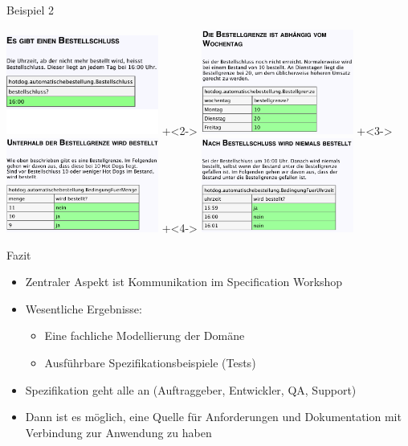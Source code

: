 \begin{frame}{Beispiel 2}

\begin{center}
\includegraphics[width=5cm]{bestellschluss.png}
\hfill{}
\onslide+<2->
\includegraphics[width=5cm]{wochentag.png}
 \newline
\onslide+<3->
\includegraphics[width=5cm]{bestellgrenze.png}
\hfill{}
\onslide+<4->
\includegraphics[width=5cm]{keineBestellungNachBestellschluss.png} 
\end{center}

\end{frame}

\begin{frame}{Fazit}

\begin{itemize}
	\item Zentraler Aspekt ist Kommunikation im Specification Workshop
	\item Wesentliche Ergebnisse:
	\begin{itemize}
		\item Eine fachliche Modellierung der Domäne
		\item Ausführbare Spezifikationsbeispiele (Tests)
	\end{itemize}
	\item Spezifikation geht alle an (Auftraggeber, Entwickler, QA, Support)
	\item Dann ist es möglich, eine Quelle für Anforderungen und Dokumentation mit Verbindung zur Anwendung zu haben
\end{itemize}

\end{frame}

